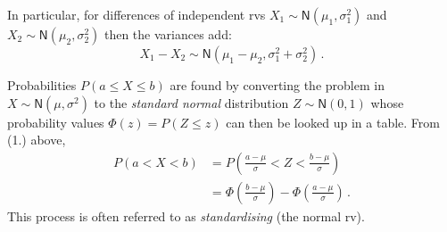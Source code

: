 \documentclass[
  a4paper,
  DIV=11,
  numbers=noendperiod,
  oneside]{scrreprt}
\theoremstyle{plain}
\theoremstyle{definition}
\theoremstyle{definition}
\theoremstyle{definition}
\theoremstyle{plain}
\theoremstyle{remark}
\begin{document}
\begin{tcolorbox}[enhanced jigsaw, colframe=quarto-callout-warning-color-frame, rightrule=.15mm, coltitle=black, colback=white, leftrule=.75mm, opacityback=0, opacitybacktitle=0.6, left=2mm, colbacktitle=quarto-callout-warning-color!10!white, arc=.35mm, title=\textcolor{quarto-callout-warning-color}{\faExclamationTriangle}\hspace{0.5em}{Variances add}, bottomtitle=1mm, toptitle=1mm, titlerule=0mm, bottomrule=.15mm, breakable, toprule=.15mm]

In particular, for differences of independent rvs
\(X_1 \sim \mathsf{N}(\mu_1, \sigma_1^2)\) and
\(X_2 \sim \mathsf{N}(\mu_2, \sigma_2^2)\) then the variances add:
\[ X_1 - X_2 \sim \mathsf{N}(\mu_1 - \mu_2, \sigma_1^2 + \sigma_2^2) \,.\]

\end{tcolorbox}

Probabilities \(P(a \leq X \leq b)\) are found by converting the problem
in \(X \sim \mathsf{N}(\mu, \sigma^2)\) to the \emph{standard normal}
distribution \(Z \sim \mathsf{N}(0, 1)\) whose probability values
\(\Phi(z) = P(Z\leq z)\) can then be looked up in a table. From (1.)
above, \[
\begin{aligned}
   P(a < X < b) &= P\left( \frac{a-\mu}{\sigma} < Z < \frac{b-\mu}{\sigma} \right) \\ 
    &= \Phi \left( \frac{b-\mu}{\sigma}\right) - \Phi\left(\frac{a-\mu}{\sigma}\right) \,.
\end{aligned}
\] This process is often referred to as \emph{standardising} (the normal
rv).
\end{document}
